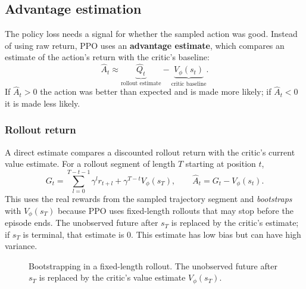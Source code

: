 \documentclass{article}
\begin{document}
\subsection{Advantage estimation}

The policy loss needs a signal for whether the sampled action was good. Instead of using raw return, PPO uses an \textbf{advantage estimate}, which compares an estimate of the action's return with the critic's baseline:
\[
  \hat{A}_t \approx \underbrace{\widehat{Q}_t}_{\text{rollout estimate}} - \underbrace{V_\phi(s_t)}_{\text{critic baseline}}.
\]
If $\hat{A}_t > 0$ the action was better than expected and is made more likely; if $\hat{A}_t < 0$ it is made less likely.

\subsubsection{Rollout return}

A direct estimate compares a discounted rollout return with the critic's current value estimate. For a rollout segment of length $T$ starting at position $t$,
\[
  G_t = \sum_{l=0}^{T-t-1} \gamma^l r_{t+l} + \gamma^{T-t} V_\phi(s_T), \qquad \hat{A}_t = G_t - V_\phi(s_t).
\]
This uses the real rewards from the sampled trajectory segment and \emph{bootstraps} with $V_\phi(s_T)$ because PPO uses fixed-length rollouts that may stop before the episode ends. The unobserved future after $s_T$ is replaced by the critic's estimate; if $s_T$ is terminal, that estimate is $0$. This estimate has low bias but can have high variance.

\begin{figure}[H]
  \centering
  \caption{Bootstrapping in a fixed-length rollout. The unobserved future after $s_T$ is replaced by the critic's value estimate $V_\phi(s_T)$.}
  \label{fig:bootstrapping}
\end{figure}
\end{document}
